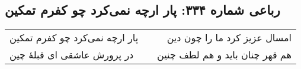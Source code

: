 \begin{center}
\section*{رباعی شماره ۳۳۴: پار ارچه نمی‌کرد چو کفرم تمکین}
\label{sec:sh334}
\begin{longtable}{l p{0.5cm} r}
پار ارچه نمی‌کرد چو کفرم تمکین
&&
امسال عزیز کرد ما را چون دین
\\
در پرورش عاشقی ای قبلهٔ چین
&&
هم قهر چنان باید و هم لطف چنین
\\
\end{longtable}
\end{center}
